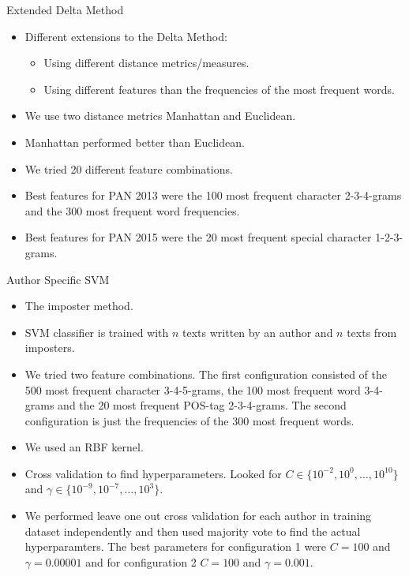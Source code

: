 \documentclass[10pt]{beamer}
\begin{document}
\begin{frame}[fragile]{Extended Delta Method}

    \begin{itemize}
        \item Different extensions to the Delta Method:
            \begin{itemize}
                \item Using different distance metrics/measures.
                \item Using different features than the frequencies of the most
                    frequent words.
            \end{itemize}
        \item We use two distance metrics Manhattan and Euclidean.
        \item Manhattan performed better than Euclidean.
        \item We tried 20 different feature combinations.
        \item Best features for PAN 2013 were the 100 most frequent character
            2-3-4-grams and the 300 most frequent word frequencies.
        \item Best features for PAN 2015 were the 20 most frequent special
            character 1-2-3-grams.
    \end{itemize}

\end{frame}

\begin{frame}[fragile]{Author Specific SVM}

    \begin{itemize}
        \item The imposter method.
        \item SVM classifier is trained with $n$ texts written by an author and
            $n$ texts from imposters.
        \item We tried two feature combinations. The first configuration
            consisted of the 500 most frequent character 3-4-5-grams, the 100
            most frequent word 3-4-grams and the 20 most frequent POS-tag
            2-3-4-grams. The second configuration is just the frequencies of
            the 300 most frequent words.
        \item We used an RBF kernel.
        \item Cross validation to find hyperparameters. Looked for $C \in
            \{10^{-2}, 10^0, \dots, 10^{10}\}$ and $\gamma \in \{10^{-9},
            10^{-7}, \dots, 10^3\}$.
        \item We performed leave one out cross validation for each author in
            training dataset independently and then used majority vote to find
            the actual hyperparamters. The best parameters for configuration 1
            were $C = 100$ and $\gamma = 0.00001$ and for configuration 2
            $C = 100$ and $\gamma = 0.001$.
    \end{itemize}

\end{frame}
\end{document}
